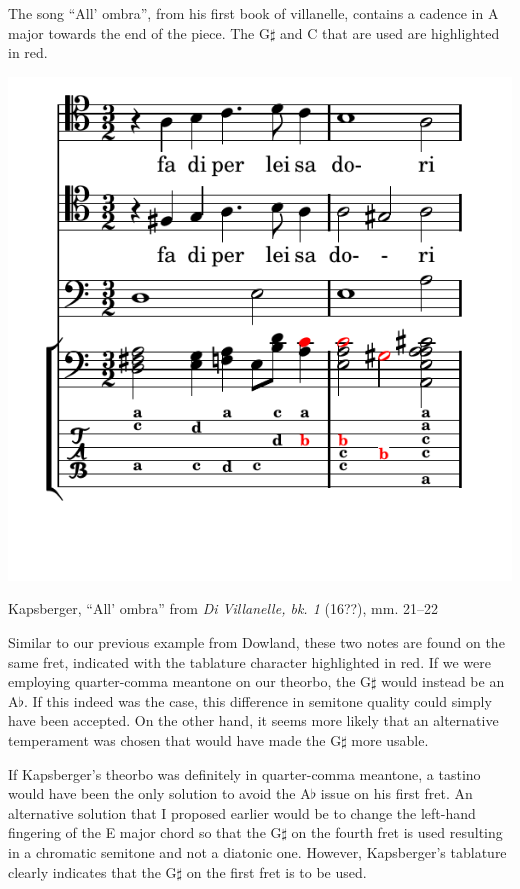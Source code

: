 The song ``All' ombra'', from his first book of villanelle, contains a cadence in A major
towards the end of the piece. The G$\sharp$ and C that are used are highlighted in red.
\begin{example}[h]
\centering
\includegraphics{examples/kaps_ombria.pdf}
\label{kaps-ombria}
\caption{Kapsberger, ``All' ombra'' from \textit{Di Villanelle, bk. 1} (16??), mm. 21--22 }
\end{example}
Similar to our previous example from Dowland, these two notes are found on the
same fret, indicated with the tablature character  highlighted in red.
If we were employing quarter-comma meantone on our theorbo, the G$\sharp$ would
instead be an A$\flat$. If this indeed was the case, this difference in semitone
quality could simply have been accepted. On the other hand, it seems more
likely that an alternative temperament was chosen that would have made the
G$\sharp$ more usable.

If Kapsberger's theorbo was definitely in quarter-comma meantone, a tastino would have been the only solution to avoid
the A$\flat$ issue on his first fret. An alternative solution that I proposed earlier would be to change the left-hand
fingering of the E major chord so that the G$\sharp$ on the fourth fret is used resulting in a chromatic semitone and
not a diatonic one. However, Kapsberger's tablature clearly indicates that the G$\sharp$ on the first fret is to be
used.

